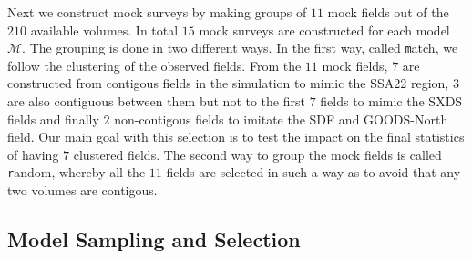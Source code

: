 \documentclass[usenatbib]{mn2e}
\begin{document}
Next we construct mock surveys by making groups of $11$ mock fields
out of the $210$ available volumes. In total $15$ mock surveys are
constructed for each model $\mathcal{M}$.
The grouping is done in two different ways. In the first way, called
{\texttt match}, we follow
the clustering of the observed fields. From the $11$ mock fields, $7$
are constructed from contigous fields in the simulation to mimic the
SSA22 region, $3$ are also contiguous between them but not to the first
$7$ fields to mimic the SXDS fields and finally $2$ non-contigous
fields to imitate the SDF and GOODS-North field. Our main goal with
this selection is to test the impact on the final statistics of having
$7$ clustered fields. The second way to group the mock fields is called {\texttt
  random}, whereby all the $11$ fields are selected in such a way as
to avoid that any two volumes are contigous.


\subsection{Model Sampling and Selection}
\end{document}

